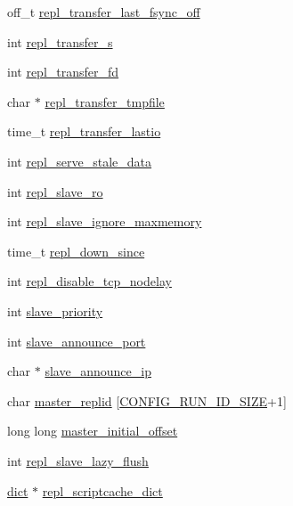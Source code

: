 \begin{DoxyCompactItemize}
off\+\_\+t \hyperlink{structredis_server_aee161759a20cb366dceab6cd980cc2ba}{repl\+\_\+transfer\+\_\+last\+\_\+fsync\+\_\+off}
\item 
int \hyperlink{structredis_server_af7b52eab258eb9f0ce90194f893d2991}{repl\+\_\+transfer\+\_\+s}
\item 
int \hyperlink{structredis_server_a276118ccb59133b72bd8833332a90429}{repl\+\_\+transfer\+\_\+fd}
\item 
char $\ast$ \hyperlink{structredis_server_a2f1f07797bc7750959217108dfff0efe}{repl\+\_\+transfer\+\_\+tmpfile}
\item 
time\+\_\+t \hyperlink{structredis_server_a15d293cf510cec1fc1fe3310ea74506e}{repl\+\_\+transfer\+\_\+lastio}
\item 
int \hyperlink{structredis_server_ac57f30da06fd89c76b8dd1f93ea0083f}{repl\+\_\+serve\+\_\+stale\+\_\+data}
\item 
int \hyperlink{structredis_server_a297743fec342702645d8b174a4877e3b}{repl\+\_\+slave\+\_\+ro}
\item 
int \hyperlink{structredis_server_a3ec18fc81887ca7248668fd8151956c3}{repl\+\_\+slave\+\_\+ignore\+\_\+maxmemory}
\item 
time\+\_\+t \hyperlink{structredis_server_abe6a14c37b00e7e4ace95e04b1c2ded7}{repl\+\_\+down\+\_\+since}
\item 
int \hyperlink{structredis_server_a56c6284aa27660523e8fe4ddc6b2f38b}{repl\+\_\+disable\+\_\+tcp\+\_\+nodelay}
\item 
int \hyperlink{structredis_server_aaf81cefb84c292ee7dee2cbf749595fb}{slave\+\_\+priority}
\item 
int \hyperlink{structredis_server_a531f1468f7a70bf4efc1004cdc8570b5}{slave\+\_\+announce\+\_\+port}
\item 
char $\ast$ \hyperlink{structredis_server_ac7835028128a4b2dbf35822063fb73f8}{slave\+\_\+announce\+\_\+ip}
\item 
char \hyperlink{structredis_server_a908131984b2d8e5cb5b7f582ab13f553}{master\+\_\+replid} \mbox{[}\hyperlink{server_8h_aba6794fa3ee28f85165eaed93190f1df}{C\+O\+N\+F\+I\+G\+\_\+\+R\+U\+N\+\_\+\+I\+D\+\_\+\+S\+I\+ZE}+1\mbox{]}
\item 
long long \hyperlink{structredis_server_a3d9da20a74aeccf932f6dccaef7075a6}{master\+\_\+initial\+\_\+offset}
\item 
int \hyperlink{structredis_server_a1456517f960c1a06b3eb29614ab5f16e}{repl\+\_\+slave\+\_\+lazy\+\_\+flush}
\item 
\hyperlink{structdict}{dict} $\ast$ \hyperlink{structredis_server_ade120d8eb790ebd186e7c4468002177f}{repl\+\_\+scriptcache\+\_\+dict}

\end{DoxyCompactItemize}
